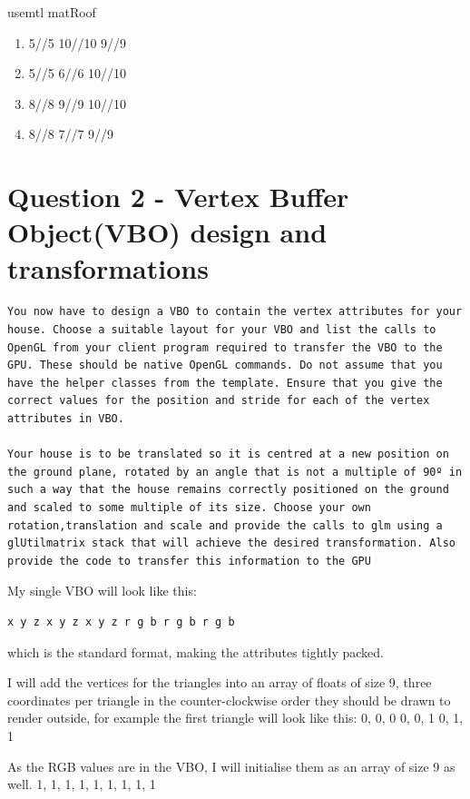 \documentclass[10pt]{report}
\begin{document}
usemtl matRoof
\begin{enumerate}[f]
    \item 5//5 10//10 9//9
    \item 5//5 6//6 10//10
    \item 8//8 9//9 10//10
    \item 8//8 7//7 9//9
\end{enumerate}


\chapter{Question 2 - Vertex Buffer Object(VBO) design and transformations}
\begin{center}
\begin{verbatim}
You now have to design a VBO to contain the vertex attributes for your house. Choose a suitable layout for your VBO and list the calls to OpenGL from your client program required to transfer the VBO to the GPU. These should be native OpenGL commands. Do not assume that you have the helper classes from the template. Ensure that you give the correct values for the position and stride for each of the vertex attributes in VBO.

Your house is to be translated so it is centred at a new position on the ground plane, rotated by an angle that is not a multiple of 90º in such a way that the house remains correctly positioned on the ground and scaled to some multiple of its size. Choose your own rotation,translation and scale and provide the calls to glm using a glUtilmatrix stack that will achieve the desired transformation. Also provide the code to transfer this information to the GPU
\end{verbatim}
\end{center}

My single VBO will look like this:
\begin{verbatim}
x y z x y z x y z r g b r g b r g b
\end{verbatim}
which is the standard format, making the attributes tightly packed.

I will add the vertices for the triangles into an array of floats of size 9, three coordinates per triangle in the counter-clockwise order they should be drawn to render outside, for example the first triangle will look like this:
{0, 0, 0
0, 0, 1
0, 1, 1}

As the RGB values are in the VBO, I will initialise them as an array of size 9 as well.
{1, 1, 1,
1, 1, 1,
1, 1, 1}
\end{document}
